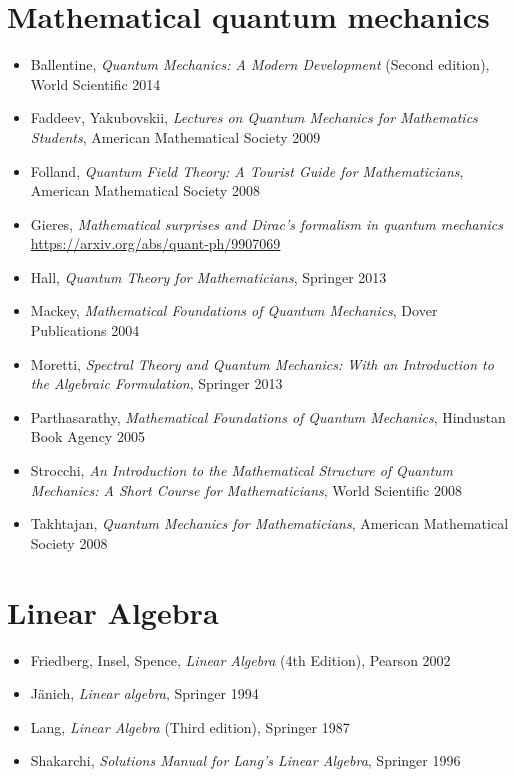 
\section*{Mathematical quantum mechanics}

\begin{itemize}
\item Ballentine, \textit{Quantum Mechanics: A Modern Development} (Second edition), World Scientific 2014
\item Faddeev, Yakubovskii, \textit{Lectures on Quantum Mechanics for Mathematics Students}, American Mathematical Society 2009
\item Folland, \textit{Quantum Field Theory: A Tourist Guide for Mathematicians},  American Mathematical Society 2008
\item Gieres, \textit{Mathematical surprises and Dirac's formalism in quantum mechanics}\\
\url{https://arxiv.org/abs/quant-ph/9907069}
\item Hall, \textit{Quantum Theory for Mathematicians}, Springer 2013
\item Mackey, \textit{Mathematical Foundations of Quantum Mechanics}, Dover Publications 2004
\item Moretti, \textit{Spectral Theory and Quantum Mechanics: With an Introduction to the Algebraic Formulation}, Springer 2013
\item Parthasarathy, \textit{Mathematical Foundations of Quantum Mechanics}, Hindustan Book Agency 2005
\item Strocchi, \textit{An Introduction to the Mathematical Structure of Quantum Mechanics: A Short Course for Mathematicians}, World Scientific 2008
\item Takhtajan, \textit{Quantum Mechanics for Mathematicians}, American Mathematical Society 2008
\end{itemize}


\section*{Linear Algebra}

\begin{itemize}
\item Friedberg, Insel, Spence, \textit{Linear Algebra} (4th Edition), Pearson 2002
\item J\"anich, \textit{Linear algebra}, Springer 1994
\item Lang, \textit{Linear Algebra} (Third edition), Springer 1987
\item Shakarchi, \textit{Solutions Manual for Lang's Linear Algebra}, Springer 1996
\end{itemize}


